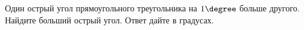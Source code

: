\begin{ex}
	\begin{condition}
		Один острый угол прямоугольного треугольника на \( 1\degree \) больше другого. Найдите больший острый угол. Ответ дайте в градусах.
	\end{condition}
\end{ex}